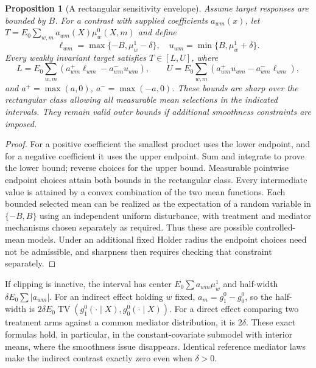\documentclass[11pt]{article}
\newtheorem{proposition}[theorem]{Proposition}
\theoremstyle{remark}
\begin{document}
\begin{proposition}[A rectangular sensitivity envelope]
Assume target responses are bounded by $B$. For a contrast with supplied coefficients $a_{wm}(x)$, let
$T=E_0\sum_{w,m}a_{wm}(X)\mu_w^0(X,m)$ and define
\[
 \ell_{wm}=\max\{-B,\mu_w^1-\delta\},\quad
 u_{wm}=\min\{B,\mu_w^1+\delta\}.
\]
Every weakly invariant target satisfies $T\in[L,U]$, where
\[
 L=E_0\sum_{w,m}(a_{wm}^+\ell_{wm}-a_{wm}^-u_{wm}),\qquad
 U=E_0\sum_{w,m}(a_{wm}^+u_{wm}-a_{wm}^-\ell_{wm}),
\]
and $a^+=\max(a,0)$, $a^-=\max(-a,0)$. These bounds are sharp over the rectangular class allowing all measurable mean selections in the indicated intervals. They remain valid outer bounds if additional smoothness constraints are imposed.
\end{proposition}
\begin{proof}
For a positive coefficient the smallest product uses the lower endpoint, and for a negative coefficient it uses the upper endpoint. Sum and integrate to prove the lower bound; reverse choices for the upper bound. Measurable pointwise endpoint choices attain both bounds in the rectangular class. Every intermediate value is attained by a convex combination of the two mean functions. Each bounded selected mean can be realized as the expectation of a random variable in $\{-B,B\}$ using an independent uniform disturbance, with treatment and mediator mechanisms chosen separately as required. Thus these are possible controlled-mean models. Under an additional fixed Holder radius the endpoint choices need not be admissible, and sharpness then requires checking that constraint separately.
\end{proof}
If clipping is inactive, the interval has center $E_0\sum a_{wm}\mu_w^1$ and half-width $\delta E_0\sum|a_{wm}|$. For an indirect effect holding $w$ fixed, $a_m=g_1^0-g_0^0$, so the half-width is
$2\delta E_0\operatorname{TV}(g_1^0(\cdot\mid X),g_0^0(\cdot\mid X))$.
For a direct effect comparing two treatment arms against a common mediator distribution, it is $2\delta$. These exact formulas hold, in particular, in the constant-covariate submodel with interior means, where the smoothness issue disappears. Identical reference mediator laws make the indirect contrast exactly zero even when $\delta>0$.
\end{document}
